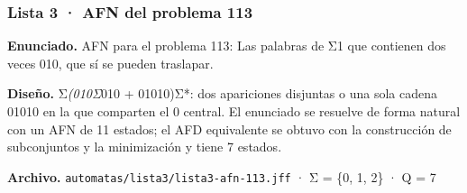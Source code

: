 
\hypertarget{lista-3-afn-del-problema-113}{%
\subsubsection{Lista 3 · AFN del problema 113}\label{lista-3-afn-del-problema-113}}

\textbf{Enunciado.} AFN para el problema 113: Las palabras de Σ1 que contienen dos veces 010, que sí se pueden traslapar.

\textbf{Diseño.} Σ\emph{(010Σ}010 + 01010)Σ*: dos apariciones disjuntas o una sola cadena 01010 en la que comparten el 0 central. El enunciado se resuelve de forma natural con un AFN de 11 estados; el AFD equivalente se obtuvo con la construcción de subconjuntos y la minimización y tiene 7 estados.

\textbf{Archivo.} \texttt{automatas/lista3/lista3-afn-113.jff} · Σ = \{0, 1, 2\} · \textbar Q\textbar{} = 7

